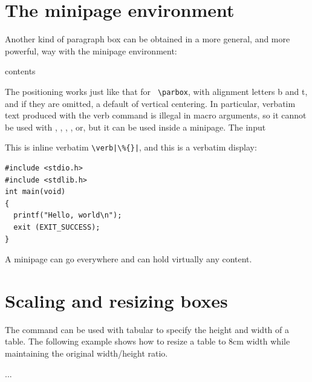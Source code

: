 {\begin{texexample}{}{}
\end{texexample}


\section*{The minipage environment}

Another kind of paragraph box can be obtained in a more general, and
more powerful, way with the minipage environment:

\begin{teX}
\begin{minipage}[position]{width}
   contents
\end{minipage}
\end{teX}


The positioning works just like that for \verb+ \parbox+, with alignment letters b
and t, and if they are omitted, a default of vertical centering.
In particular, verbatim text produced with the verb command is illegal
in macro arguments, so it cannot be used with , , ,
, or, but it can be used inside a minipage. The input


\begin{texexample}{}{}
\begin{minipage}{170pt}
This is inline verbatim \verb=\verb|\%{}|=, and this
is a verbatim display:

\begin{verbatim}
#include <stdio.h>
#include <stdlib.h>
int main(void)
{
  printf("Hello, world\n");
  exit (EXIT_SUCCESS);
}
\end{verbatim}
\end{minipage}

\end{texexample}


A minipage can go everywhere and can hold virtually any content.





\section{Scaling and resizing boxes}

The command  can be used with tabular to specify the height and width of a table. The following example shows how to resize a table to 8cm width while maintaining the original width/height ratio.

\begin{teX}
\resizebox{8cm}{!} {
  \begin{tabular}...
  \end{tabular}
}
\end{teX}

}
